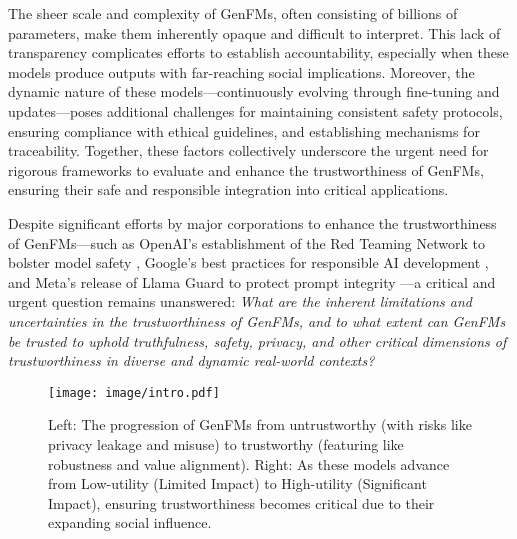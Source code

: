 The sheer scale and complexity of GenFMs, often consisting of billions of parameters, make them inherently opaque and difficult to interpret. This lack of transparency complicates efforts to establish accountability, especially when these models produce outputs with far-reaching social implications. Moreover, the dynamic nature of these models—continuously evolving through fine-tuning and updates—poses additional challenges for maintaining consistent safety protocols, ensuring compliance with ethical guidelines, and establishing mechanisms for traceability. Together, these factors collectively underscore the urgent need for rigorous frameworks to evaluate and enhance the trustworthiness of GenFMs, ensuring their safe and responsible integration into critical applications.

Despite significant efforts by major corporations to enhance the trustworthiness of GenFMs—such as OpenAI's establishment of the Red Teaming Network to bolster model safety \cite{openai_red_teaming_network}, Google's best practices for responsible AI development \cite{googleresponsibleAI, googleresearchresponsibleAI, googleresponsibleAIpractices}, and Meta's release of Llama Guard to protect prompt integrity \cite{llama_prompt_guard}—a critical and urgent question remains unanswered: \textit{What are the inherent limitations and uncertainties in the trustworthiness of GenFMs, and to what extent can GenFMs be trusted to uphold truthfulness, safety, privacy, and other critical dimensions of trustworthiness in diverse and dynamic real-world contexts?}

\begin{figure}
    \centering
    \texttt{[image: image/intro.pdf]}
    \caption{Left: The progression of GenFMs from untrustworthy (with risks like privacy leakage and misuse) to trustworthy (featuring like robustness and value alignment). Right: As these models advance from Low-utility (Limited Impact) to High-utility (Significant Impact), ensuring trustworthiness becomes critical due to their expanding social influence.}
    \label{fig:intro}
    \vspace{-15pt}
\end{figure}



